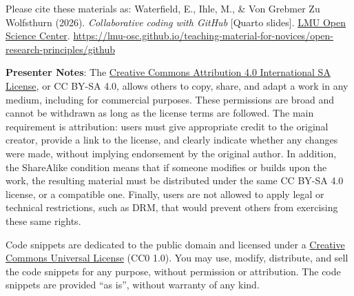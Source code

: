 \documentclass[
  letterpaper,
  DIV=11,
  numbers=noendperiod]{scrartcl}
\begin{document}
Please cite these materials as: Waterfield, E., Ihle, M., \& Von Grebmer
Zu Wolfsthurn (2026). \emph{Collaborative coding with GitHub} {[}Quarto
slides{]}. \href{https://www.osc.lmu.de/}{LMU Open Science Center}.
\url{https://lmu-osc.github.io/teaching-material-for-novices/open-research-principles/github}

\textbf{Presenter Notes}: The
\href{https://creativecommons.org/licenses/by-sa/4.0/deed.en}{Creative
Commons Attribution 4.0 International SA License}, or CC BY-SA 4.0,
allows others to copy, share, and adapt a work in any medium, including
for commercial purposes. These permissions are broad and cannot be
withdrawn as long as the license terms are followed. The main
requirement is attribution: users must give appropriate credit to the
original creator, provide a link to the license, and clearly indicate
whether any changes were made, without implying endorsement by the
original author. In addition, the ShareAlike condition means that if
someone modifies or builds upon the work, the resulting material must be
distributed under the same CC BY-SA 4.0 license, or a compatible one.
Finally, users are not allowed to apply legal or technical restrictions,
such as DRM, that would prevent others from exercising these same
rights.

Code snippets are dedicated to the public domain and licensed under a
\href{https://creativecommons.org/publicdomain/zero/1.0/}{Creative
Commons Universal License} (CC0 1.0). You may use, modify, distribute,
and sell the code snippets for any purpose, without permission or
attribution. The code snippets are provided ``as is'', without warranty
of any kind.
\end{document}
